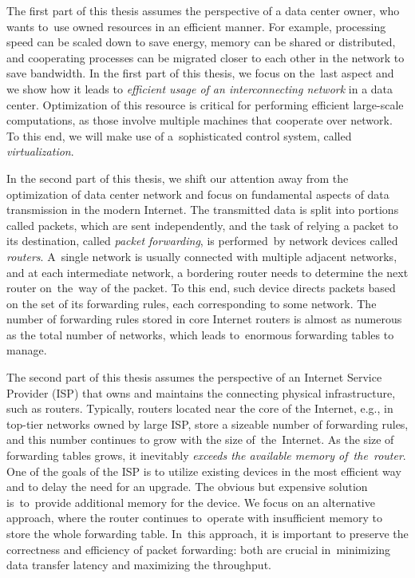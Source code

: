 \medskip
The first part of this thesis assumes the perspective of a data center owner, who wants to~use owned resources in an efficient manner.
For example, processing speed can be scaled down to save energy, memory can be shared or distributed, and cooperating processes can be migrated closer to each other in the network to save bandwidth.
In the first part of this thesis, we focus on the~last aspect and we show how it leads to
\emph{efficient usage of an interconnecting network} in a data center.
Optimization of this resource is critical for performing efficient large-scale computations, as those involve multiple machines that cooperate over network.
To this end, we will make use of a~sophisticated control system, called \emph{virtualization}.

\medskip

In the second part of this thesis, we shift our attention away from the optimization of data center network and focus on fundamental aspects of data transmission in the modern Internet.
The transmitted data is split into portions called packets, which are sent independently, and the task of relying a packet to its destination, called \emph{packet forwarding}, is performed~by network devices called \emph{routers}.
A~single network is usually connected with multiple adjacent networks, and at each intermediate network, a bordering router needs to determine the next router on~the~way of the packet.
To this end, such device directs packets based on the set of its forwarding rules, each corresponding to some network.
The number of forwarding rules stored in core Internet routers is almost as numerous as the total number of networks, which leads to~enormous forwarding tables to manage.

The second part of this thesis assumes the perspective of an Internet Service Provider (ISP) that owns and maintains the connecting physical infrastructure, such as routers.
Typically, routers located near the core of the Internet, e.g., in top-tier networks owned by large ISP, store a sizeable number of forwarding rules, and this number continues to grow with the size of~the~Internet.
As the size of forwarding tables grows, it inevitably \emph{exceeds the available memory of~the~router}.
One of the goals of the ISP is to utilize existing devices in the most efficient way and to delay the need for an upgrade.
The obvious but expensive solution is~to~provide additional memory for the device.
We focus on an alternative approach, where the router continues to~operate with insufficient memory to store the whole forwarding table.
In~this approach, it is important to preserve the correctness and efficiency of packet forwarding: both are crucial in~minimizing data transfer latency and maximizing the throughput.


